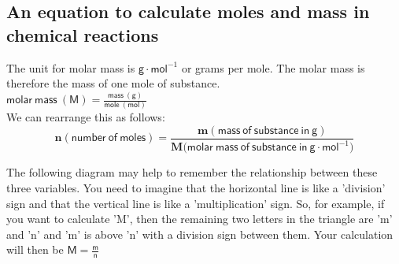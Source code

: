             \subsection*{An equation to calculate moles and mass in chemical reactions}
            \nopagebreak
      \label{m38717*id277432}The unit for molar mass is $\mathsf{g} \cdot \mathsf{mol}^{-1}$ or grams per mole. The molar mass is therefore the mass of one mole of substance. \\
$\mathsf{molar ~mass ~(M)} = \frac{\mathsf{mass ~(g)}}{\mathsf{mole ~(mol)}}$ \\
We can rearrange this as follows:
      \label{m38717*id277436}\nopagebreak\noindent{}
    \begin{equation*}
    \mathbf{n} \mathsf{(number ~of ~moles)} = \frac{\mathbf{m}\mathsf{(mass ~of ~substance ~in ~g)}}{\mathbf{M} \mathsf{(molar ~mass ~of ~substance ~in }~\mathsf{g}\cdot\mathsf{mol}^{-1}\mathsf{)}}
      \end{equation*}
\label{m38717*notfhsst!!!underscore!!!id374}
	\par
      \label{m38717*id277605}The following diagram may help to remember the relationship between these three variables. You need to imagine that the horizontal line is like a 'division' sign and that the vertical line is like a 'multiplication' sign. So, for example, if you want to calculate 'M', then the remaining two letters in the triangle are 'm' and 'n' and 'm' is above 'n' with a division sign between them. Your calculation will then be $\mathsf{M}=\frac{\mathsf{m}}{\mathsf{n}}$\par 
      \label{m38717*id277613}
    \setcounter{subfigure}{0}
	\begin{figure}[H] %
\begin{center}
\end{center}
 \end{figure}       
      \par 
